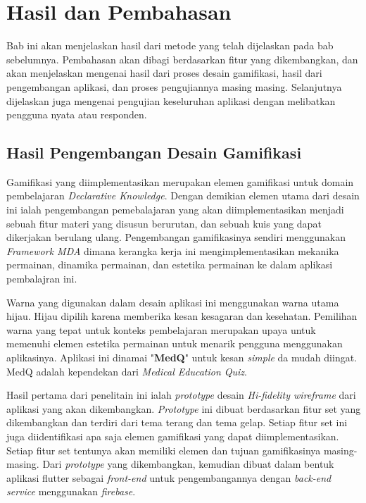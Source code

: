 \chapter{Hasil dan Pembahasan}
Bab ini akan menjelaskan hasil dari metode yang telah dijelaskan pada bab sebelumnya. 
Pembahasan akan dibagi berdasarkan fitur yang dikembangkan, dan akan menjelaskan mengenai hasil dari proses desain gamifikasi, hasil dari pengembangan aplikasi, dan proses pengujiannya masing masing.
Selanjutnya dijelaskan juga mengenai pengujian keseluruhan aplikasi dengan melibatkan pengguna nyata atau responden.

\section{Hasil Pengembangan Desain Gamifikasi}
Gamifikasi yang diimplementasikan merupakan elemen gamifikasi untuk domain pembelajaran \textit{Declarative Knowledge}.
Dengan demikian elemen utama dari desain ini ialah pengembangan pemebalajaran yang akan diimplementasikan menjadi sebuah fitur materi yang disusun berurutan, dan sebuah kuis yang dapat dikerjakan berulang ulang.
Pengembangan gamifikasinya sendiri menggunakan \textit{Framework MDA} dimana kerangka kerja ini mengimplementasikan mekanika permainan, dinamika permainan, dan estetika permainan ke dalam aplikasi pembalajran ini.

Warna yang digunakan dalam desain aplikasi ini menggunakan warna utama hijau.
Hijau dipilih karena memberika kesan kesagaran dan kesehatan.
Pemilihan warna yang tepat untuk konteks pembelajaran merupakan upaya untuk memenuhi elemen estetika permainan untuk menarik pengguna menggunakan aplikasinya.  
Aplikasi ini dinamai "\textbf{MedQ}" untuk kesan \textit{simple} da mudah diingat. MedQ adalah kependekan dari \textit{Medical Education Quiz}.

Hasil pertama dari penelitain ini ialah \textit{prototype} desain \textit{Hi-fidelity wireframe} dari aplikasi yang akan dikembangkan.
\textit{Prototype} ini dibuat berdasarkan fitur set yang dikembangkan dan terdiri dari tema terang dan tema gelap. Setiap fitur set ini juga diidentifikasi apa saja elemen gamifikasi yang dapat diimplementasikan.
Setiap fitur set tentunya akan memiliki elemen dan tujuan gamifikasinya masing-masing. Dari \textit{prototype} yang dikembangkan, kemudian dibuat dalam bentuk aplikasi flutter sebagai \textit{front-end} untuk pengembangannya dengan \textit{back-end service} menggunakan \textit{firebase}.

\newpage
